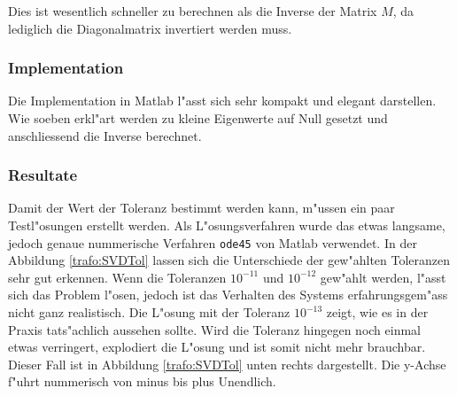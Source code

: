 \begin{refsection}
Dies ist wesentlich schneller zu berechnen als die Inverse der Matrix $M$, da lediglich die Diagonalmatrix invertiert werden muss.

\subsubsection{Implementation}
Die Implementation in Matlab l"asst sich sehr kompakt und elegant darstellen. Wie soeben erkl"art werden zu kleine Eigenwerte auf Null gesetzt und anschliessend die Inverse berechnet. 

{\scriptsize }

\subsubsection{Resultate}
Damit der Wert der Toleranz bestimmt werden kann, m"ussen ein paar Testl"osungen erstellt werden. Als L"osungsverfahren wurde das etwas langsame, jedoch genaue nummerische Verfahren \texttt{ode45} von Matlab verwendet. In der Abbildung \ref{trafo:SVDTol} lassen sich die Unterschiede der gew"ahlten Toleranzen sehr gut erkennen. Wenn die Toleranzen $10^{-11}$ und $10^{-12}$ gew"ahlt werden, l"asst sich das Problem l"osen, jedoch ist das Verhalten des Systems erfahrungsgem"ass nicht ganz realistisch. Die L"osung mit der Toleranz $10^{-13}$ zeigt, wie es in der Praxis tats"achlich aussehen sollte. Wird die Toleranz hingegen noch einmal etwas verringert, explodiert die L"osung und ist somit nicht mehr brauchbar. Dieser Fall ist in Abbildung \ref{trafo:SVDTol} unten rechts dargestellt. Die y-Achse f"uhrt nummerisch von minus bis plus Unendlich.


\end{refsection}
